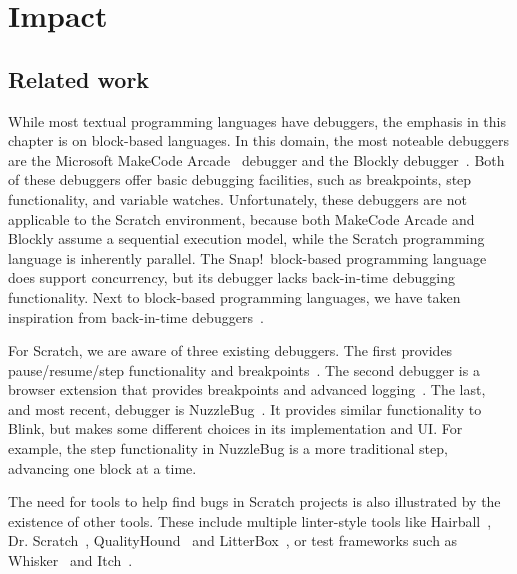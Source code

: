 \documentclass[../main]{subfiles}
\begin{document}
\section{Impact}\label{sec:blink-impact}

\subsection{Related work}\label{subsec:related-work}
While most textual programming languages have debuggers, the emphasis in this chapter is on block-based languages.
In this domain, the most noteable debuggers are the Microsoft MakeCode Arcade~\autocite{ballMicrosoftMakeCodeEmbedded2019a} debugger and the Blockly debugger~\autocite{savidisCompleteBlockLevelVisual2020a}.
Both of these debuggers offer basic debugging facilities, such as breakpoints, step functionality, and variable watches.
Unfortunately, these debuggers are not applicable to the Scratch environment, because both MakeCode Arcade and Blockly assume a sequential execution model, while the Scratch programming language is inherently parallel.
The Snap!\ block-based programming language~\autocite{garciaSnapBuildYour2012a} does support concurrency, but its debugger lacks back-in-time debugging functionality.
Next to block-based programming languages, we have taken inspiration from back-in-time debuggers~\autocite{barrTardisAffordableTimetravel2014a,barrTimetravelDebuggingJavaScript2016a}.

For Scratch, we are aware of three existing debuggers.
The first provides pause/resume/step functionality and breakpoints~\autocite{wangDevelopingResourcesDebugging2021}.
The second debugger is a browser extension that provides breakpoints and advanced logging~\autocite{ScratchAddons2023}.
The last, and most recent, debugger is NuzzleBug~\autocite{deinerNuzzleBugDebuggingBlockbased2023}.
It provides similar functionality to Blink, but makes some different choices in its implementation and UI\@.
For example, the step functionality in NuzzleBug is a more traditional step, advancing one block at a time.

The need for tools to help find bugs in Scratch projects is also illustrated by the existence of other tools.
These include multiple linter-style tools like Hairball~\autocite{boeHairballLintinspiredStatic2013}, Dr. Scratch~\autocite{moreno-leonDrScratchWeb2015}, QualityHound~\autocite{techapalokulQualityHoundOnline2017} and LitterBox~\autocite{fraserLitterBoxLinterScratch2021}, or test frameworks such as Whisker~\autocite{stahlbauerTestingScratchPrograms2019} and Itch~\autocite{johnsonITCHIndividualTesting2016}.
\end{document}
